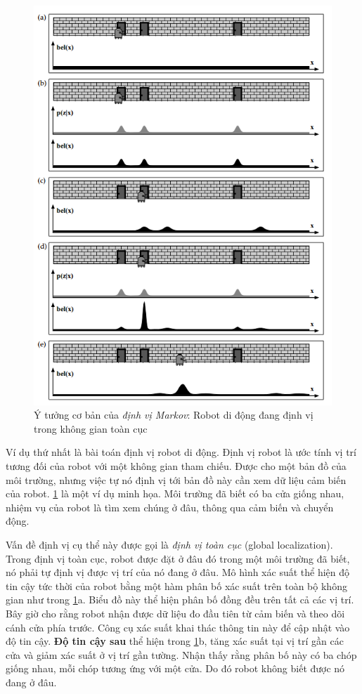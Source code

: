 \begin{figure}[htbp]
  \centering
  \includegraphics[width=0.8\linewidth]{figures/markovLocalization.png}
  \caption{Ý tưởng cơ bản của \textit{định vị Markov}: Robot di động đang định vị trong không gian toàn cục \cite{thrun2005probabilistic}}
  \label{fig:markovLocalization}
\end{figure}

Ví dụ thứ nhất là bài toán định vị robot di động. Định vị robot là ước tính vị trí tương đối của robot với một không gian tham chiếu. Được cho một bản đồ của môi trường, nhưng việc tự nó định vị tới bản đồ này cần xem dữ liệu cảm biến của robot. \figurename{ \ref{fig:markovLocalization}} là một ví dụ minh họa. Môi trường đã biết có ba cửa giống nhau, nhiệm vụ của robot là tìm xem chúng ở đâu, thông qua cảm biến và chuyển động.

Vấn đề định vị cụ thể này được gọi là \textit{định vị toàn cục} (global localization). Trong định vị toàn cục, robot được đặt ở đâu đó trong một môi trường đã biết, nó phải tự định vị được vị trí của nó đang ở đâu. Mô hình xác suất thể hiện độ tin cậy tức thời của robot bằng một hàm phân bố xác suất trên toàn bộ không gian như trong \figurename{ \ref{fig:markovLocalization}}a. Biểu đồ này thể hiện phân bố đồng đều trên tất cả các vị trí. Bây giờ cho rằng robot nhận được dữ liệu đo đầu tiên từ cảm biến và theo dõi cánh cửa phía trước. Công cụ xác suất khai thác thông tin này để cập nhật vào độ tin cậy.
\textbf{Độ tin cậy sau}
thể hiện trong \figurename{ \ref{fig:markovLocalization}}b, tăng xác suất tại vị trí gần các cửa và giảm xác suất ở vị trí gần tường.
Nhận thấy rằng phân bố này có ba chóp giống nhau, mỗi chóp tương ứng với một cửa. Do đó robot không biết được nó đang ở đâu.

